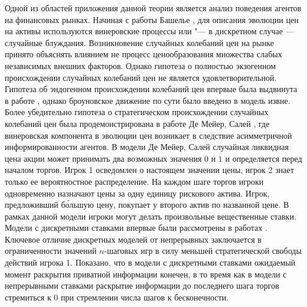 Одной из областей приложения данной теории является анализ поведения агентов на
финансовых рынках. Начиная с работы Башелье \cite{bachelier1900}, для описания
эволюции цен на активы используются винеровские процессы или "--- в дискретном
случае --- случайные блуждания. Возникновение случайных колебаний цен на рынке
принято объяснять влиянием не процесс ценообразования множества слабых
независимых внешних факторов. Однако гипотеза о полностью экзогенном
происхождении случайных колебаний цен не является удовлетворительной. Гипотеза
об эндогенном происхождении колебаний цен впервые была выдвинута в работе
\cite{kyle85}, однако броуновское движение по сути было введено в модель извне.
Более убедительно гипотеза о стратегическом происхождении случайных колебаний
цен была продемонстрирована в работе Де Мейер, Салей \cite{demeyer02}, где
винеровская компонента в эволюции цен возникает в следствие асимметричной
информированности агентов. В модели Де Мейер, Салей случайная ликвидная цена
акции может принимать два возможных значения $0$ и $1$ и определяется перед
началом торгов. Игрок 1 осведомлен о настоящем значении цены, игрок 2 знает
только ее вероятностное распределение. На каждом шаге торгов игроки одновременно
назначают цены за одну единицу рискового актива. Игрок, предложивший б\'{о}льшую
цену, покупает у второго актив по названной цене. В рамках данной модели игроки
могут делать произвольные вещественные ставки. Модели с дискретными ставками
впервые были рассмотрены в работах \cite{demeyer05, domansky07}. Ключевое
отличие дискретных моделей от непрерывных заключается в ограниченности значений
$n$-шаговых игр в силу меньшей стратегической свободы действий игрока 1.
Показано, что в модели с дискретными ставками ожидаемый момент раскрытия
приватной информации конечен, в то время как в модели с непрерывными ставками
раскрытие информации до последнего шага торгов стремиться к $0$ при стремлении
числа шагов к бесконечности.

